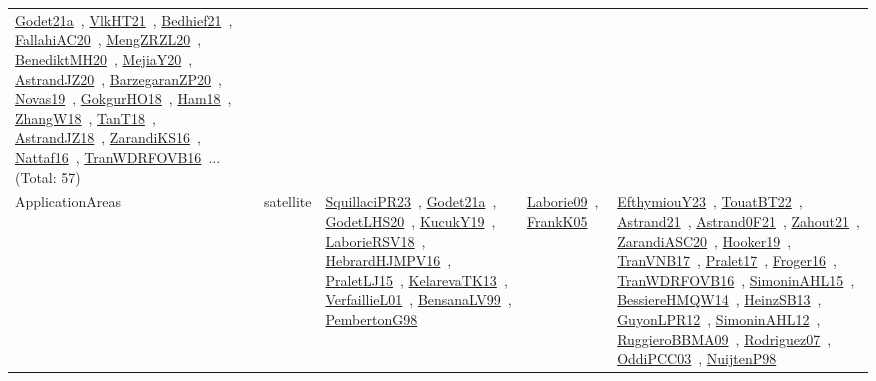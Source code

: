 {\begin{longtable}{lp{3cm}>{\raggedright\arraybackslash}p{6cm}>{\raggedright\arraybackslash}p{6cm}>{\raggedright\arraybackslash}p{8cm}}
\href{works/Godet21a.pdf}{Godet21a}~\cite{Godet21a}, \href{works/VlkHT21.pdf}{VlkHT21}~\cite{VlkHT21}, \href{works/Bedhief21.pdf}{Bedhief21}~\cite{Bedhief21}, \href{works/FallahiAC20.pdf}{FallahiAC20}~\cite{FallahiAC20}, \href{works/MengZRZL20.pdf}{MengZRZL20}~\cite{MengZRZL20}, \href{works/BenediktMH20.pdf}{BenediktMH20}~\cite{BenediktMH20}, \href{works/MejiaY20.pdf}{MejiaY20}~\cite{MejiaY20}, \href{works/AstrandJZ20.pdf}{AstrandJZ20}~\cite{AstrandJZ20}, \href{works/BarzegaranZP20.pdf}{BarzegaranZP20}~\cite{BarzegaranZP20}, \href{works/Novas19.pdf}{Novas19}~\cite{Novas19}, \href{works/GokgurHO18.pdf}{GokgurHO18}~\cite{GokgurHO18}, \href{works/Ham18.pdf}{Ham18}~\cite{Ham18}, \href{works/ZhangW18.pdf}{ZhangW18}~\cite{ZhangW18}, \href{works/TanT18.pdf}{TanT18}~\cite{TanT18}, \href{works/AstrandJZ18.pdf}{AstrandJZ18}~\cite{AstrandJZ18}, \href{works/ZarandiKS16.pdf}{ZarandiKS16}~\cite{ZarandiKS16}, \href{works/Nattaf16.pdf}{Nattaf16}~\cite{Nattaf16}, \href{works/TranWDRFOVB16.pdf}{TranWDRFOVB16}~\cite{TranWDRFOVB16}... (Total: 57)\\
ApplicationAreas & satellite & \href{works/SquillaciPR23.pdf}{SquillaciPR23}~\cite{SquillaciPR23}, \href{works/Godet21a.pdf}{Godet21a}~\cite{Godet21a}, \href{works/GodetLHS20.pdf}{GodetLHS20}~\cite{GodetLHS20}, \href{works/KucukY19.pdf}{KucukY19}~\cite{KucukY19}, \href{works/LaborieRSV18.pdf}{LaborieRSV18}~\cite{LaborieRSV18}, \href{works/HebrardHJMPV16.pdf}{HebrardHJMPV16}~\cite{HebrardHJMPV16}, \href{works/PraletLJ15.pdf}{PraletLJ15}~\cite{PraletLJ15}, \href{works/KelarevaTK13.pdf}{KelarevaTK13}~\cite{KelarevaTK13}, \href{works/VerfaillieL01.pdf}{VerfaillieL01}~\cite{VerfaillieL01}, \href{works/BensanaLV99.pdf}{BensanaLV99}~\cite{BensanaLV99}, \href{works/PembertonG98.pdf}{PembertonG98}~\cite{PembertonG98} & \href{works/Laborie09.pdf}{Laborie09}~\cite{Laborie09}, \href{works/FrankK05.pdf}{FrankK05}~\cite{FrankK05} & \href{works/EfthymiouY23.pdf}{EfthymiouY23}~\cite{EfthymiouY23}, \href{works/TouatBT22.pdf}{TouatBT22}~\cite{TouatBT22}, \href{works/Astrand21.pdf}{Astrand21}~\cite{Astrand21}, \href{works/Astrand0F21.pdf}{Astrand0F21}~\cite{Astrand0F21}, \href{works/Zahout21.pdf}{Zahout21}~\cite{Zahout21}, \href{works/ZarandiASC20.pdf}{ZarandiASC20}~\cite{ZarandiASC20}, \href{works/Hooker19.pdf}{Hooker19}~\cite{Hooker19}, \href{works/TranVNB17.pdf}{TranVNB17}~\cite{TranVNB17}, \href{works/Pralet17.pdf}{Pralet17}~\cite{Pralet17}, \href{works/Froger16.pdf}{Froger16}~\cite{Froger16}, \href{works/TranWDRFOVB16.pdf}{TranWDRFOVB16}~\cite{TranWDRFOVB16}, \href{works/SimoninAHL15.pdf}{SimoninAHL15}~\cite{SimoninAHL15}, \href{works/BessiereHMQW14.pdf}{BessiereHMQW14}~\cite{BessiereHMQW14}, \href{works/HeinzSB13.pdf}{HeinzSB13}~\cite{HeinzSB13}, \href{works/GuyonLPR12.pdf}{GuyonLPR12}~\cite{GuyonLPR12}, \href{works/SimoninAHL12.pdf}{SimoninAHL12}~\cite{SimoninAHL12}, \href{works/RuggieroBBMA09.pdf}{RuggieroBBMA09}~\cite{RuggieroBBMA09}, \href{works/Rodriguez07.pdf}{Rodriguez07}~\cite{Rodriguez07}, \href{works/OddiPCC03.pdf}{OddiPCC03}~\cite{OddiPCC03}, \href{works/NuijtenP98.pdf}{NuijtenP98}~\cite{NuijtenP98}\\

\end{longtable}}
